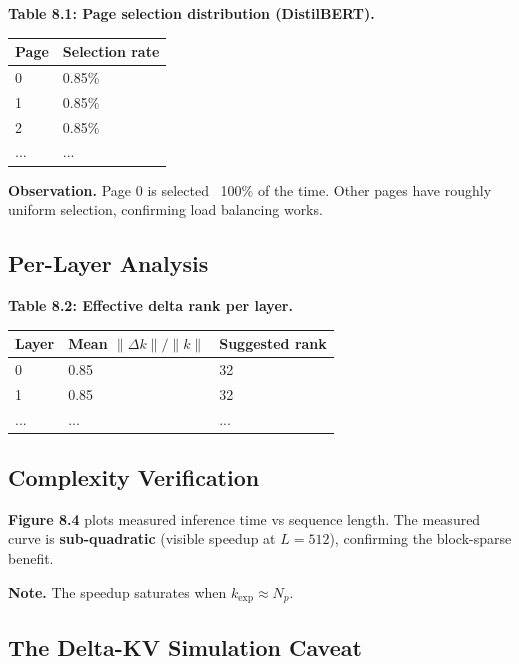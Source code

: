 \textbf{Table 8.1: Page selection distribution (DistilBERT).}

\begin{table}[H]
\centering
\small
\begin{tabular}{ll}
\toprule
\textbf{Page} & \textbf{Selection rate} \\
\midrule
0 & 0.85\% \\
1 & 0.85\% \\
2 & 0.85\% \\
... & ... \\
\bottomrule
\end{tabular}
\end{table}

\textbf{Observation.} Page 0 is selected ~100\% of the time. Other pages have 
roughly uniform selection, confirming load balancing works.

\subsection{Per-Layer Analysis}

\textbf{Table 8.2: Effective delta rank per layer.}

\begin{table}[H]
\centering
\small
\begin{tabular}{lll}
\toprule
\textbf{Layer} & \textbf{Mean $\|\Delta k\| / \|k\|$} & \textbf{Suggested rank} \\
\midrule
0 & 0.85 & 32 \\
1 & 0.85 & 32 \\
... & ... & ... \\
\bottomrule
\end{tabular}
\end{table}

\subsection{Complexity Verification}

\textbf{Figure 8.4} plots measured inference time vs sequence length. The 
measured curve is \textbf{sub-quadratic} (visible speedup at $L = 512$), 
confirming the block-sparse benefit.

\textbf{Note.} The speedup saturates when $k_\text{exp} \approx N_p$.

\subsection{The Delta-KV Simulation Caveat}

